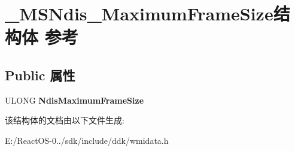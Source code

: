 \hypertarget{struct___m_s_ndis___maximum_frame_size}{}\section{\+\_\+\+M\+S\+Ndis\+\_\+\+Maximum\+Frame\+Size结构体 参考}
\label{struct___m_s_ndis___maximum_frame_size}
\subsection*{Public 属性}
\begin{DoxyCompactItemize}
\item 
\mbox{\label{struct___m_s_ndis___maximum_frame_size_ae19280ba63539832994acf5b47a6e31a}} 
U\+L\+O\+NG {\bfseries Ndis\+Maximum\+Frame\+Size}
\end{DoxyCompactItemize}


该结构体的文档由以下文件生成\+:\begin{DoxyCompactItemize}
\item 
E\+:/\+React\+O\+S-\/0../sdk/include/ddk/wmidata.\+h\end{DoxyCompactItemize}
